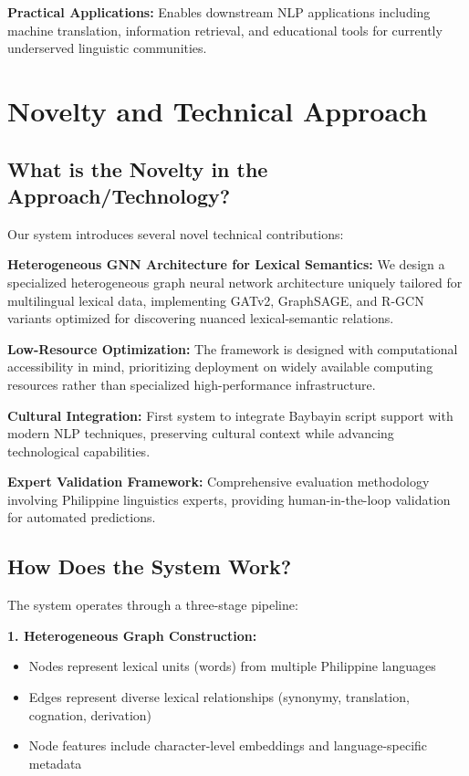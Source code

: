 \documentclass[11pt]{article}
\begin{document}
\textbf{Practical Applications:} Enables downstream NLP applications including machine translation, information retrieval, and educational tools for currently underserved linguistic communities.

\section{Novelty and Technical Approach}

\subsection{What is the Novelty in the Approach/Technology?}

Our system introduces several novel technical contributions:

\textbf{Heterogeneous GNN Architecture for Lexical Semantics:} We design a specialized heterogeneous graph neural network architecture uniquely tailored for multilingual lexical data, implementing GATv2, GraphSAGE, and R-GCN variants optimized for discovering nuanced lexical-semantic relations.

\textbf{Low-Resource Optimization:} The framework is designed with computational accessibility in mind, prioritizing deployment on widely available computing resources rather than specialized high-performance infrastructure.

\textbf{Cultural Integration:} First system to integrate Baybayin script support with modern NLP techniques, preserving cultural context while advancing technological capabilities.

\textbf{Expert Validation Framework:} Comprehensive evaluation methodology involving Philippine linguistics experts, providing human-in-the-loop validation for automated predictions.

\subsection{How Does the System Work?}

The system operates through a three-stage pipeline:

\textbf{1. Heterogeneous Graph Construction:}
\begin{itemize}
    \item Nodes represent lexical units (words) from multiple Philippine languages
    \item Edges represent diverse lexical relationships (synonymy, translation, cognation, derivation)
    \item Node features include character-level embeddings and language-specific metadata
\end{itemize}
\end{document}
